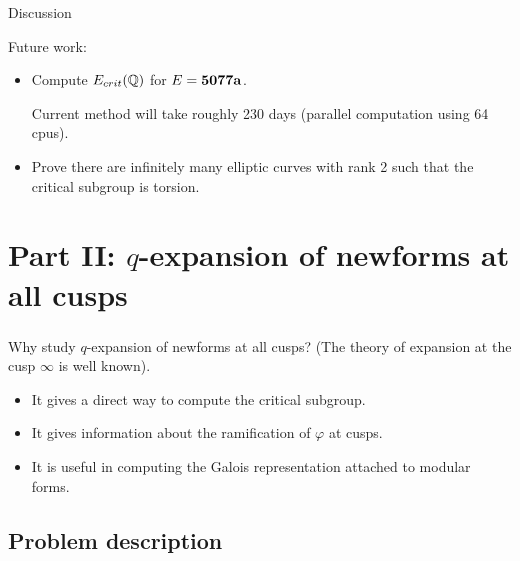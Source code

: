 \documentclass[handout]{beamer}
\begin{document}
\begin{frame}{Discussion}

\pause
\smallskip
Future work: 
\begin{itemize}
\item Compute $E_{crit}(\mathbb{Q})$ for $E = {\bf 5077a}$. 

Current method will take roughly  230 days (parallel computation using 64 cpus). 

\item Prove there are infinitely many elliptic curves with rank  2 such that the critical subgroup is 
torsion.
\end{itemize}

\end{frame}







\section{Part II: $q$-expansion of newforms at all cusps} 

 \begin{frame}
 \frametitle{\insertsection}
Why study $q$-expansion of newforms at all cusps? (The theory of expansion at the cusp $\infty$
is well known).

\pause 

\begin{itemize}
\item It gives a direct way to compute the critical subgroup. 
\item It gives information about the ramification of $\varphi$ at cusps. 
\item It is useful in computing the Galois representation attached to modular forms. 
\end{itemize}

\end{frame}


\subsection{Problem description}
\end{document}
